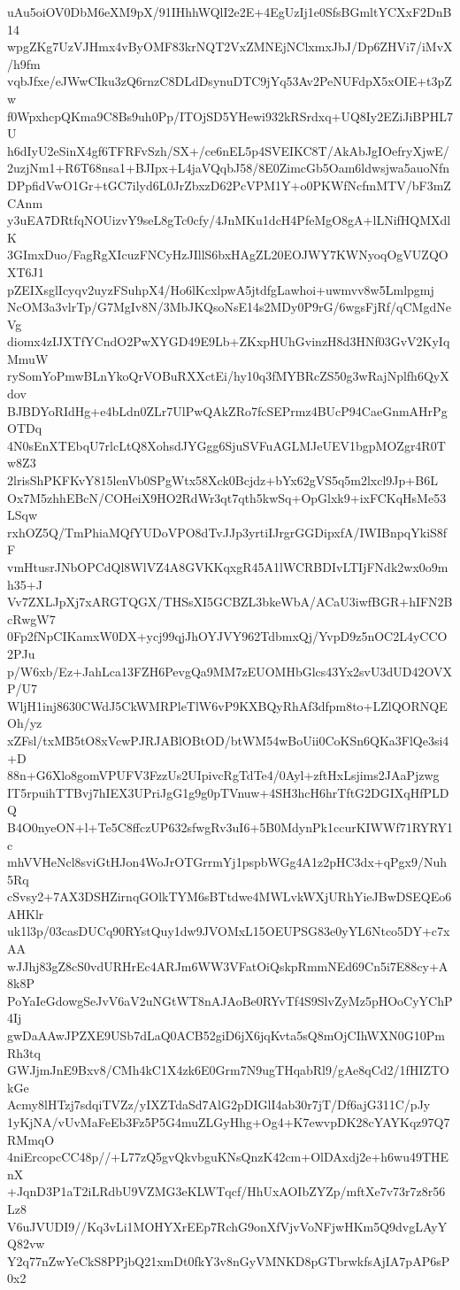 uAu5oiOV0DbM6eXM9pX/91IHhhWQlI2e2E+4EgUzIj1e0SfsBGmltYCXxF2DnB14
wpgZKg7UzVJHmx4vByOMF83krNQT2VxZMNEjNClxmxJbJ/Dp6ZHVi7/iMvX/h9fm
vqbJfxe/eJWwCIku3zQ6rnzC8DLdDsynuDTC9jYq53Av2PeNUFdpX5xOIE+t3pZw
f0WpxhcpQKma9C8Bs9uh0Pp/ITOjSD5YHewi932kRSrdxq+UQ8Iy2EZiJiBPHL7U
h6dIyU2eSinX4gf6TFRFvSzh/SX+/ce6nEL5p4SVEIKC8T/AkAbJgIOefryXjwE/
2uzjNm1+R6T68nsa1+BJIpx+L4jaVQqbJ58/8E0ZimcGb5Oam6ldwsjwa5auoNfn
DPpfidVwO1Gr+tGC7ilyd6L0JrZbxzD62PcVPM1Y+o0PKWfNcfmMTV/bF3mZCAnm
y3uEA7DRtfqNOUizvY9seL8gTc0cfy/4JnMKu1dcH4PfeMgO8gA+lLNifHQMXdlK
3GImxDuo/FagRgXIcuzFNCyHzJIllS6bxHAgZL20EOJWY7KWNyoqOgVUZQOXT6J1
pZEIXsglIcyqv2uyzFSuhpX4/Ho6lKcxlpwA5jtdfgLawhoi+uwmvv8w5Lmlpgmj
NcOM3a3vlrTp/G7MgIv8N/3MbJKQsoNsE14s2MDy0P9rG/6wgsFjRf/qCMgdNeVg
diomx4zIJXTfYCndO2PwXYGD49E9Lb+ZKxpHUhGvinzH8d3HNf03GvV2KyIqMmuW
rySomYoPmwBLnYkoQrVOBuRXXctEi/hy10q3fMYBRcZS50g3wRajNplfh6QyXdov
BJBDYoRIdHg+e4bLdn0ZLr7UlPwQAkZRo7fcSEPrmz4BUcP94CaeGnmAHrPgOTDq
4N0sEnXTEbqU7rlcLtQ8XohsdJYGgg6SjuSVFuAGLMJeUEV1bgpMOZgr4R0Tw8Z3
2lrisShPKFKvY815lenVb0SPgWtx58Xck0Bcjdz+bYx62gVS5q5m2lxcl9Jp+B6L
Ox7M5zhhEBcN/COHeiX9HO2RdWr3qt7qth5kwSq+OpGlxk9+ixFCKqHsMe53LSqw
rxhOZ5Q/TmPhiaMQfYUDoVPO8dTvJJp3yrtiIJrgrGGDipxfA/IWIBnpqYkiS8fF
vmHtusrJNbOPCdQl8WlVZ4A8GVKKqxgR45A1lWCRBDIvLTIjFNdk2wx0o9mh35+J
Vv7ZXLJpXj7xARGTQGX/THSsXI5GCBZL3bkeWbA/ACaU3iwfBGR+hIFN2BcRwgW7
0Fp2fNpCIKamxW0DX+ycj99qjJhOYJVY962TdbmxQj/YvpD9z5nOC2L4yCCO2PJu
p/W6xb/Ez+JahLca13FZH6PevgQa9MM7zEUOMHbGlcs43Yx2svU3dUD42OVXP/U7
WljH1inj8630CWdJ5CkWMRPleTlW6vP9KXBQyRhAf3dfpm8to+LZlQORNQEOh/yz
xZFsl/txMB5tO8xVcwPJRJABlOBtOD/btWM54wBoUii0CoKSn6QKa3FlQe3si4+D
88n+G6Xlo8gomVPUFV3FzzUs2UIpivcRgTdTe4/0Ayl+zftHxLsjims2JAaPjzwg
IT5rpuihTTBvj7hIEX3UPriJgG1g9g0pTVnuw+4SH3hcH6hrTftG2DGIXqHfPLDQ
B4O0nyeON+l+Te5C8ffczUP632sfwgRv3uI6+5B0MdynPk1ccurKIWWf71RYRY1c
mhVVHeNcl8sviGtHJon4WoJrOTGrrmYj1pspbWGg4A1z2pHC3dx+qPgx9/Nuh5Rq
cSvsy2+7AX3DSHZirnqGOlkTYM6sBTtdwe4MWLvkWXjURhYieJBwDSEQEo6AHKlr
uk1l3p/03casDUCq90RYstQuy1dw9JVOMxL15OEUPSG83e0yYL6Ntco5DY+c7xAA
wJJhj83gZ8cS0vdURHrEc4ARJm6WW3VFatOiQskpRmmNEd69Cn5i7E88cy+A8k8P
PoYaIeGdowgSeJvV6aV2uNGtWT8nAJAoBe0RYvTf4S9SlvZyMz5pHOoCyYChP4Ij
gwDaAAwJPZXE9USb7dLaQ0ACB52giD6jX6jqKvta5sQ8mOjCIhWXN0G10PmRh3tq
GWJjmJnE9Bxv8/CMh4kC1X4zk6E0Grm7N9ugTHqabRl9/gAe8qCd2/1fHIZTOkGe
Acmy8lHTzj7sdqiTVZz/yIXZTdaSd7AlG2pDIGlI4ab30r7jT/Df6ajG311C/pJy
1yKjNA/vUvMaFeEb3Fz5P5G4muZLGyHhg+Og4+K7ewvpDK28cYAYKqz97Q7RMmqO
4niErcopcCC48p//+L77zQ5gvQkvbguKNsQnzK42cm+OlDAxdj2e+h6wu49THEnX
+JqnD3P1aT2iLRdbU9VZMG3eKLWTqcf/HhUxAOIbZYZp/mftXe7v73r7z8r56Lz8
V6uJVUDI9//Kq3vLi1MOHYXrEEp7RchG9onXfVjvVoNFjwHKm5Q9dvgLAyYQ82vw
Y2q77nZwYeCkS8PPjbQ21xmDt0fkY3v8nGyVMNKD8pGTbrwkfsAjIA7pAP6sP0x2
